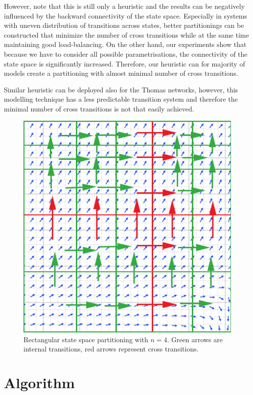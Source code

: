 \documentclass[12pt,oneside]{fithesis2}
\begin{document}
			However, note that this is still only a heuristic and the results can be negatively influenced by the backward connectivity of the state space. Especially in systems with uneven distribution of transitions across states, better partitionings can be constructed that minimize the number of cross transitions while at the same time maintaining good load-balancing. On the other hand, our experiments show that because we have to consider all possible parametrisations, the connectivity of the state space is significantly increased. Therefore, our heuristic can for majority of models create a partitioning with almost minimal number of cross transitions. 
			
			Similar heuristic can be deployed also for the Thomas networks, however, this modelling technique has a less predictable transition system and therefore the minimal number of cross transitions is not that easily achieved. 
			

\begin{figure}
\begin{center}
\includegraphics[scale=.40]{trans.png}
\end{center}
\vspace*{-0.5em}
\caption{Rectangular state space partitioning with $n = 4$. Green arrows are internal transitions, red arrows represent cross transitions.}
\label{fig:3dresults}
\end{figure}			
		
		
    \chapter{Algorithm}
    
\end{document}
